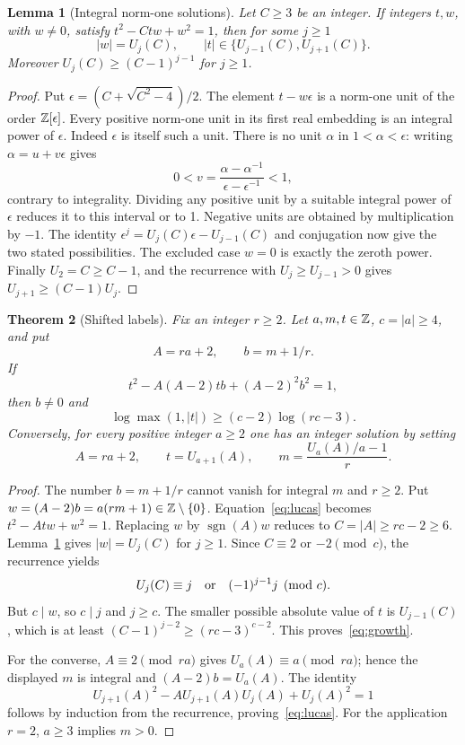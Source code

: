 \documentclass[11pt,a4paper]{article}
\newtheorem{theorem}{Theorem}[section]\newtheorem{lemma}[theorem]{Lemma}\newtheorem{proposition}[theorem]{Proposition}\newtheorem{corollary}[theorem]{Corollary}
\begin{document}
\begin{lemma}[Integral norm-one solutions]\label{lem:units}
Let $C\ge3$ be an integer. If integers $t,w$, with $w\ne0$, satisfy
$t^2-Ctw+w^2=1$, then for some $j\ge1$
\[
 |w|=U_j(C),\qquad |t|\in\{U_{j-1}(C),U_{j+1}(C)\}.
\]
Moreover $U_j(C)\ge(C-1)^{j-1}$ for $j\ge1$.
\end{lemma}
\begin{proof}
Put $\epsilon=(C+\sqrt{C^2-4})/2$. The element $t-w\epsilon$
is a norm-one unit of the order $\mathbb Z[\epsilon]$. Every positive norm-one
unit in its first real embedding is an integral power of $\epsilon$.
Indeed $\epsilon$ is itself such a unit. There is no unit $\alpha$ in
$1<\alpha<\epsilon$: writing $\alpha=u+v\epsilon$ gives
\[
 0<v=\frac{\alpha-\alpha^{-1}}{\epsilon-\epsilon^{-1}}<1,
\]
contrary to integrality. Dividing any positive unit by a suitable integral
power of $\epsilon$ reduces it to this interval or to 1. Negative units
are obtained by multiplication by $-1$. The identity
$\epsilon^j=U_j(C)\epsilon-U_{j-1}(C)$ and conjugation now give the two
stated possibilities. The excluded case $w=0$ is exactly the zeroth power.
Finally $U_2=C\ge C-1$, and the recurrence with
$U_j\ge U_{j-1}>0$ gives $U_{j+1}\ge(C-1)U_j$.
\end{proof}

\begin{theorem}[Shifted labels]\label{thm:lucas}
Fix an integer $r\ge2$. Let $a,m,t\in\mathbb Z$, $c=|a|\ge4$, and put
\[
 A=ra+2,\qquad b=m+1/r.
\]
If
\begin{equation}\label{eq:lucas}
 t^2-A(A-2)tb+(A-2)^2b^2=1,
\end{equation}
then $b\ne0$ and
\begin{equation}\label{eq:growth}
 \log\max(1,|t|)\ge(c-2)\log(rc-3).
\end{equation}
Conversely, for every positive integer $a\ge2$ one has an integer solution
by setting
\begin{equation}\label{eq:lucas-complete}
 A=ra+2,\qquad t=U_{a+1}(A),\qquad
 m=\frac{U_a(A)/a-1}{r}.
\end{equation}
\end{theorem}
\begin{proof}
The number $b=m+1/r$ cannot vanish for integral $m$ and $r\ge2$.
Put $w=(A-2)b=a(rm+1)\in\mathbb Z\setminus\{0\}$.
Equation~\eqref{eq:lucas} becomes $t^2-Atw+w^2=1$.
Replacing $w$ by $\operatorname{sgn}(A)w$ reduces to $C=|A|\ge rc-2\ge6$.
Lemma~\ref{lem:units} gives $|w|=U_j(C)$ for $j\ge1$.
Since $C\equiv2$ or $-2\pmod c$, the recurrence yields
\[
 U_j(C)\equiv j\quad\hbox{or}\quad(-1)^{j-1}j\pmod c.
\]
But $c\mid w$, so $c\mid j$ and $j\ge c$.
The smaller possible absolute value of $t$ is $U_{j-1}(C)$, which is
at least $(C-1)^{j-2}\ge(rc-3)^{c-2}$. This proves~\eqref{eq:growth}.

For the converse, $A\equiv2\pmod{ra}$ gives $U_a(A)\equiv a\pmod{ra}$;
hence the displayed $m$ is integral and $(A-2)b=U_a(A)$.
The identity
\[
 U_{j+1}(A)^2-AU_{j+1}(A)U_j(A)+U_j(A)^2=1
\]
follows by induction from the recurrence, proving~\eqref{eq:lucas}.
For the application $r=2$, $a\ge3$ implies $m>0$.
\end{proof}
\end{document}
